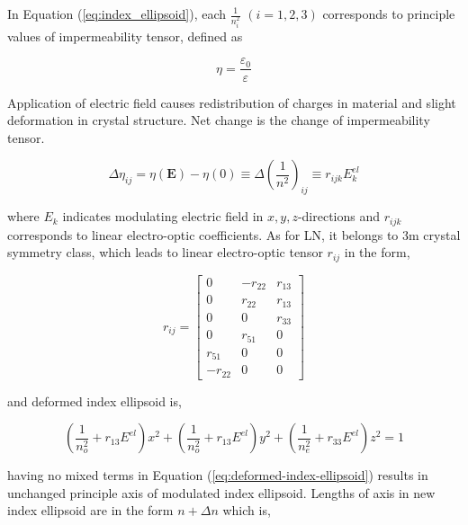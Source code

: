 \documentclass[thesis]{deutez}
\begin{document}
    In Equation (\ref{eq:index_ellipsoid}), each $\frac{1}{n^2_{i}}$ $(i=1,2,3)$ corresponds to principle values of impermeability tensor, defined as

    \begin{equation}
        \eta = \frac{\varepsilon_0}{\varepsilon}
        \label{eq:impermeability}
    \end{equation}

    Application of electric field causes redistribution of charges in material and slight deformation in crystal structure. Net change is the change of impermeability tensor. 

    \begin{equation}
        \Delta\eta _ {ij} = \eta(\mathbf{E})-\eta(0) \equiv \Delta \left( \frac{1}{n^2} \right)_{ij} \equiv r_{ijk}E_k^{el}
        \label{eq:elect-opt-mod-imperm}
    \end{equation}

    where $E_k$ indicates modulating electric field in $x,y,z$-directions and $r_{ijk}$ corresponds to linear electro-optic coefficients. As for LN, it belongs to 3m crystal symmetry class, which leads to linear electro-optic tensor $r_{ij}$ in the form,

    \begin{equation}
        r_{ij}=
        \begin{bmatrix}
            0 & -r_{22} & r_{13}\\
            0 & r_{22} & r_{13} \\
            0 & 0 & r_{33}\\
            0 & r_{51} & 0\\
            r_{51} & 0 & 0\\
            -r_{22} & 0 & 0 
            
        \end{bmatrix}
        \label{eq:3m-linear-el-opt-tensor}
    \end{equation}

    and deformed index ellipsoid is,

    \begin{equation}
        \left(\frac{1}{n_o^2} + r_{13}E^{el}\right)x^2+\left(\frac{1}{n_o^2} + r_{13}E^{el}\right)y^2+\left(\frac{1}{n_e^2} + r_{33}E^{el}\right)z^2 = 1
        \label{eq:deformed-index-ellipsoid}
    \end{equation}
    
    having no mixed terms in Equation (\ref{eq:deformed-index-ellipsoid}) results in unchanged principle axis of modulated index ellipsoid. Lengths of axis in new index ellipsoid are in the form $n+\Delta n$ which is,
\end{document}
